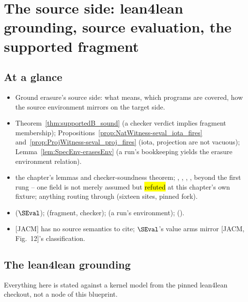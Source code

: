 \chapter{The source side: lean4lean grounding, source evaluation, the supported fragment}
\label{chap:source}

\section*{At a glance}
\begin{itemize}
\item {} Ground erasure's source side: what  means, which programs are
covered, how the source environment mirrors on the target side.
\item {} Theorem~\ref{thm:supportedB_sound} (a checker verdict implies fragment
membership); Propositions~\ref{prop:NatWitness-seval_iota_fires}
and~\ref{prop:ProjWitness-seval_proj_fires} (iota, projection are not vacuous);
Lemma~\ref{lem:SpecEnv-erasesEnv} (a run's bookkeeping yields the erasure environment relation).
\item {} \stProved{} the chapter's lemmas and checker-soundness theorem;
\stAssumed{} , , , ,
 beyond the first rung -- one  field is not merely
assumed but \hl{refuted} at this chapter's own fixture; \stInherited{} anything routing through
\TrExprS{} (sixteen  sites, pinned fork).
\item {}  ($\SEval$);  (fragment,
checker);  (a run's \lbox{} environment); 
().
\item {} [JACM] has no source semantics to cite; $\SEval$'s value arms mirror [JACM,
Fig.~12]'s  classification.
\end{itemize}

\section{The lean4lean grounding}
\label{sec:source:lean4lean}

Everything here is stated against a kernel model from the pinned lean4lean checkout, not a node of
this blueprint.

